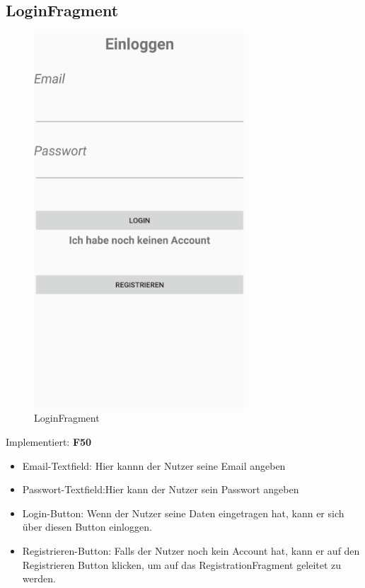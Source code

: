 \subsection{LoginFragment}
\begin{figure}[H]
	\centering
	\includegraphics[width=0.7\textwidth]{pics/loginFragment.png}%
	\caption{LoginFragment}%
	\label{view}%
\end{figure}
Implementiert: \textbf{F50}
\begin{itemize}[nosep]
	\item Email-Textfield: Hier kannn der Nutzer seine Email angeben
	\item Passwort-Textfield:Hier kann der Nutzer sein Passwort angeben
	\item Login-Button: Wenn der Nutzer seine Daten eingetragen hat, kann er sich über diesen Button einloggen.
	\item Registrieren-Button: Falls der Nutzer noch kein Account hat, kann er auf den Registrieren Button klicken, um auf das RegistrationFragment geleitet zu werden.
\end{itemize}

